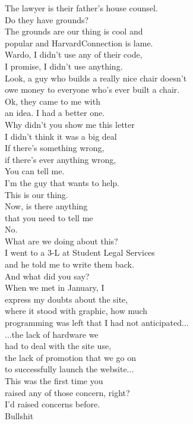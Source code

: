 \documentclass{article}
\begin{document}
\begin{multicols}{3}
The lawyer is their father's house counsel.\\
Do they have grounds?\\
The grounds are our thing is cool and\\
popular and HarvardConnection is lame.\\
Wardo, I didn't use any of their code,\\
I promise, I didn't use anything.\\
Look, a guy who builds a really nice chair doesn't\\
owe money to everyone who's ever built a chair.\\
Ok, they came to me with\\
an idea. I had a better one.\\
Why didn't you show me this letter\\
I didn't think it was a big deal\\
If there's something wrong,\\
if there's ever anything wrong,\\
You can tell me.\\
I'm the guy that wants to help.\\
This is our thing.\\
Now, is there anything\\
that you need to tell me\\
No.\\
What are we doing about this?\\
I went to a 3-L at Student Legal Services\\
and he told me to write them back.\\
And what did you say?\\
When we met in January, I\\
express my doubts about the site,\\
where it stood with graphic, how much\\
programming was left that I had not anticipated...\\
...the lack of hardware we\\
had to deal with the site use,\\
the lack of promotion that we go on\\
to successfully launch the website...\\
This was the first time you\\
raised any of those concern, right?\\
I'd raised concerns before.\\
Bullshit\\

\end{multicols}
\end{document}
